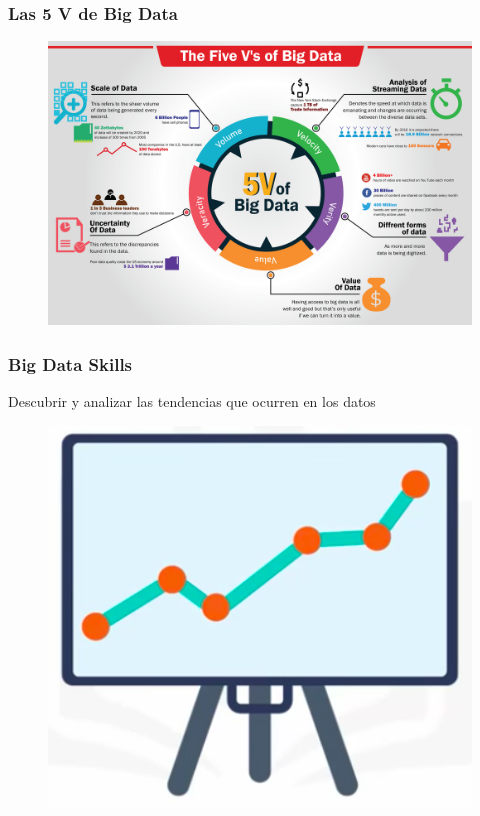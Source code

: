 \documentclass{beamer}
\begin{document}
\begin{frame}
\frametitle{Las 5 V de Big Data}
\begin{figure}
\includegraphics[scale=0.18]{img/1_BigData_5V}
\end{figure}
\end{frame}



\begin{frame}
\frametitle{Big Data Skills}
Descubrir y analizar las tendencias que ocurren en los datos
\begin{figure}
\includegraphics[scale=0.3]{img/2_BigData_Skill}
\end{figure}
\end{frame}
\end{document}
